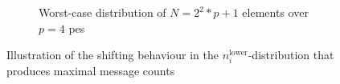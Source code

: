 \begin{figure}[H]
\begin{subfigure}{1.0\textwidth}
\caption{Worst-case distribution of $N=2^2*p+1$ elements over $p=4$ \glspl{pe}}
\label{fig:messageCountShiftingWorstCase}
\end{subfigure}

\caption{Illustration of the shifting behaviour in the $n_i^\textrm{lower}$-distribution that produces maximal message counts}
\label{fig:messageCountShifting}
\end{figure}


%		
%		
%
%
